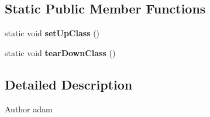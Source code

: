 \subsection*{Static Public Member Functions}
\begin{DoxyCompactItemize}
\item 
\hypertarget{classCASUAL_1_1crypto_1_1SHA256sumTest_a06a1d0f62fa9ada30ee9a8cd4bcfb4cc}{static void {\bfseries set\-Up\-Class} ()}\label{classCASUAL_1_1crypto_1_1SHA256sumTest_a06a1d0f62fa9ada30ee9a8cd4bcfb4cc}

\item 
\hypertarget{classCASUAL_1_1crypto_1_1SHA256sumTest_a8a5c2572e4645b39464d7536437ce51f}{static void {\bfseries tear\-Down\-Class} ()}\label{classCASUAL_1_1crypto_1_1SHA256sumTest_a8a5c2572e4645b39464d7536437ce51f}

\end{DoxyCompactItemize}


\subsection{Detailed Description}
\begin{DoxyAuthor}{Author}
adam 
\end{DoxyAuthor}


